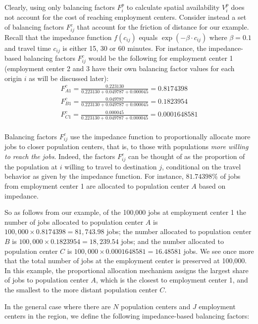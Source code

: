 \documentclass[10pt,letterpaper]{article}
\begin{document}
Clearly, using only balancing factors \(F^p_{i}\) to calculate spatial
availability \(V^p_i\) does not account for the cost of reaching
employment centers. Consider instead a set of balancing factors
\(F^c_{ij}\) that account for the friction of distance for our example.
Recall that the impedance function \(f(c_{ij})\) equals
\(\exp(-\beta\cdot c_{ij})\) where \(\beta = 0.1\) and travel time
\(c_{ij}\) is either 15, 30 or 60 minutes. For instance, the
impedance-based balancing factors \(F^c_{ij}\) would be the following
for employment center 1 (employment center 2 and 3 have their own
balancing factor values for each origin \(i\) as will be discussed
later): \[
\begin{array}{l}
F^c_{A1} = \frac{0.223130}{0.223130 + 0.049787 + 0.000045} = 0.8174398\\
F^c_{B1} = \frac{0.049787}{0.223130 + 0.049787 + 0.000045} = 0.1823954\\
F^c_{C1} = \frac{0.000045}{0.223130 + 0.049787 + 0.000045} = 0.0001648581\\
\end{array}
\]

Balancing factors \(F^c_{ij}\) use the impedance function to
proportionally allocate more jobs to closer population centers, that is,
to those with populations \emph{more willing to reach the jobs}. Indeed,
the factors \(F^c_{ij}\) can be thought of as the proportion of the
population at \(i\) willing to travel to destination \(j\), conditional
on the travel behavior as given by the impedance function. For instance,
\({81.74398}\%\) of jobs from employment center 1 are allocated to
population center \(A\) based on impedance.

So as follows from our example, of the 100,000 jobs at employment center
1 the number of jobs allocated to population center \(A\) is
\(100,000\times 0.8174398 = 81,743.98\) jobs; the number allocated to
population center \(B\) is \(100,000\times 0.1823954 = 18,239.54\) jobs;
and the number allocated to population center \(C\) is
\(100,000\times 0.0001648581 = 16.48581\) jobs. We see once more that
the total number of jobs at the employment center is preserved at
100,000. In this example, the proportional allocation mechanism assigns
the largest share of jobs to population center \(A\), which is the
closest to employment center 1, and the smallest to the more distant
population center \(C\).

In the general case where there are \(N\) population centers and \(J\)
employment centers in the region, we define the following
impedance-based balancing factors:
\end{document}
